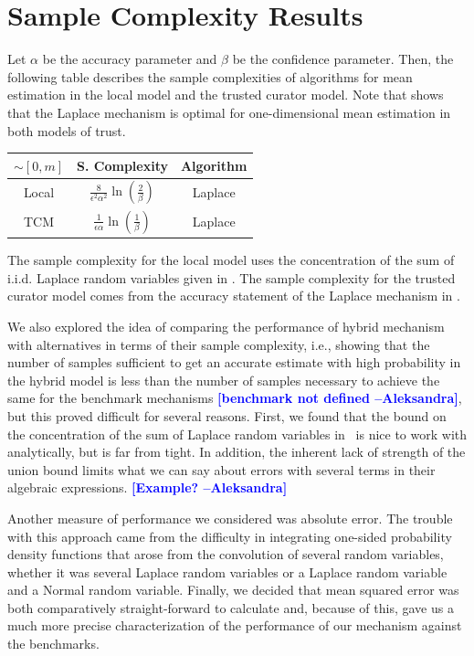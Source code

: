 \documentclass{article}
\newcommand{\ak}[1]{\textcolor{blue}{\bf\small [#1 --Aleksandra]}}
\theoremstyle{plain}
\begin{document}
\section{Sample Complexity Results}\label{sec:sample-complexity}
Let $\alpha$ be the accuracy parameter and $\beta$ be the confidence parameter. Then, the following table describes the sample complexities of algorithms for mean estimation in the local model and the trusted curator model. Note that  \cite{duchi} shows that the Laplace mechanism is optimal for one-dimensional mean estimation in both models of trust.
\begin{center}
\begin{tabular}{ |c|c|c| }
 \hline
 $\sim [0,m]$ & S. Complexity & Algorithm \\ [1.5ex]
 \hline
 Local & $ \frac{8}{\epsilon^2 \alpha^2} \ln\left(\frac{2}{\beta}\right)$ & Laplace \\ [1.5ex]
 \hline
 TCM & $\frac{1}{\epsilon \alpha}\ln\left(\frac{1}{\beta}\right)$ & Laplace \\ [1.5ex]
 \hline
\end{tabular}
\end{center}

The sample complexity for the local model uses the concentration of the sum of i.i.d. Laplace random variables given in \cite{chan2011private}. The sample complexity for the trusted curator model comes from the accuracy statement of the Laplace mechanism in \cite{dmns06}.

We also explored the idea of comparing the performance of hybrid mechanism with alternatives in terms of their sample complexity, i.e., showing that the number of samples sufficient to get an accurate estimate with high probability in the hybrid model is less than the number of samples necessary to achieve the same for the benchmark mechanisms \ak{benchmark not defined}, but this proved difficult for several reasons. First, we found that the bound on the concentration of the sum of Laplace random variables in~\cite{chan2011private} is nice to work with analytically, but is far from tight. In addition, the inherent lack of strength of the union bound limits what we can say about errors with several terms in their algebraic expressions. \ak{Example?} 



Another measure of performance we considered was absolute error. The trouble with this approach came from the difficulty in integrating one-sided probability density functions that arose from the convolution of several random variables, whether it was several Laplace random variables or a Laplace random variable and a Normal random variable. Finally, we decided that mean squared error was both comparatively straight-forward to calculate and, because of this, gave us a much more precise characterization of the performance of our mechanism against the benchmarks.
\end{document}
